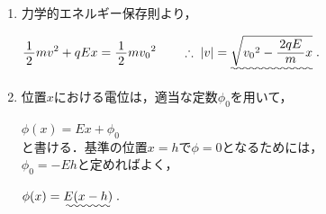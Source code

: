 ﻿\documentclass[../../../ps_a.tex]{subfiles}
\begin{document}
    \begin{enumerate}
        \item 力学的エネルギー保存則より，

            \myspaceb%
            $\displaystyle%
                \myfraca{1}{2}mv^2 + qEx = \myfraca{1}{2}m{v_0}^2%
                \qquad \therefore \; |v|= \uwave{\sqrt{{v_0}^2 - \myfracd{2qE}{m}x}} \;.
            $            
        \item 位置$x$における電位は，適当な定数$\phi_0$を用いて，
            
            \myspaceb%
            $\displaystyle%
                \phi(x) = Ex + \phi_0
            $\\            
            と書ける．基準の位置$x=h$で$\phi=0$となるためには，\\
            $\phi_0 = -Eh$と定めればよく，
            
            \myspaceb%
            $\displaystyle%
                \phi(x) = \uwave{E(x - h)} \;.
            $
    \end{enumerate}
\end{document}
